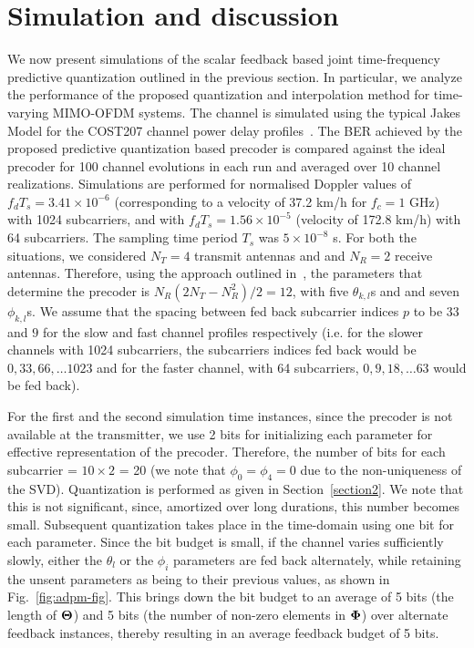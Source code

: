\documentclass[journal,10pt,twocolumn]{IEEEtran}
\begin{document}
\section{Simulation and discussion}
\label{section3}
We now present simulations of the scalar feedback based joint
time-frequency predictive quantization outlined in the previous
section. In particular, we analyze the performance of the proposed
quantization and interpolation method for time-varying MIMO-OFDM
systems. The channel is simulated using the typical Jakes Model 
for the COST207 channel power delay
profiles~\cite{molisch2006cost259,cost1989cost}. The BER achieved by
the proposed predictive quantization based precoder is compared
against the ideal precoder for 100 channel evolutions in each run and
averaged over 10 channel realizations. Simulations are performed for
normalised Doppler values of $f_dT_s = 3.41\times 10^{-6}$ (corresponding
to a velocity of 37.2 km/h for $f_c = 1$ GHz) with 1024 subcarriers, and with
$f_dT_s = 1.56 \times 10^{-5}$ (velocity of 172.8 km/h) with 64
subcarriers. The sampling time period $T_s$ was $5\times10^{-8}$
s. For both the situations, we considered $N_T=4$ transmit antennas
and and $N_R=2$ receive antennas. Therefore, using the approach
outlined in~\cite{4114278}, the parameters that determine the precoder is
$N_{R}(2N_{T} - N^{2}_R )/2 = 12$, with five $\theta_{k,l}$s and and seven
$\phi_{k,l}$s. We assume that the spacing between fed back subcarrier
indices $p$ to be $33$ and $9$ for the slow and fast channel profiles
respectively (i.e. for the slower channels with 1024 subcarriers, the
subcarriers indices fed back would be $0, 33, 66, \ldots 1023$ and for
the faster channel, with 64 subcarriers, $0, 9, 18, \ldots 63$ would
be fed back).

For the first and the second simulation time instances, since the
precoder is not available at the transmitter, we use 2 bits for
initializing each parameter for effective representation of the
precoder. Therefore, the number of bits for each subcarrier =
$10\times 2$ = 20 (we note that $\phi_0 = \phi_4 = 0$ due to the
non-uniqueness of the SVD). Quantization is performed as given in
Section~\ref{section2}. We note that this is not significant, since,
amortized over long durations, this number becomes small. Subsequent
quantization takes place in the time-domain using one bit for each
parameter. Since the bit budget is small, if the channel varies
sufficiently slowly, either the $\theta_l$ or the $\phi_i$ parameters
are fed back alternately, while retaining the unsent parameters as
being to their previous values, as shown in
Fig.~\ref{fig:adpm-fig}.
This brings down the bit budget to an average of 5 bits (the length of
$\bf{\Theta}$) and 5 bits (the number of non-zero elements in
$\bf{\Phi}$) over alternate feedback instances, thereby resulting in
an average feedback budget of 5 bits.
\end{document}
